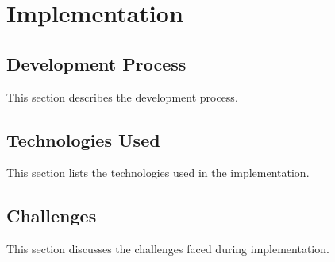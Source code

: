 \chapter{Implementation}
\label{chap:implementation}

\section{Development Process}
This section describes the development process.

\section{Technologies Used}
This section lists the technologies used in the implementation.

\section{Challenges}
This section discusses the challenges faced during implementation.
